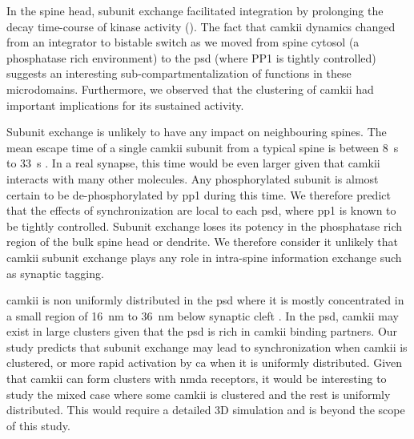 \documentclass[9pt,lineno,doublespacing]{elife}
\begin{document}
In the spine head, subunit exchange facilitated integration by prolonging the
decay time-course of kinase activity ().  The fact that
\gls{camkii} dynamics changed from an integrator to bistable switch as we moved
from spine cytosol (a phosphatase rich environment) to the \gls{psd} (where PP1
is tightly controlled) suggests an interesting sub-compartmentalization of
functions in these microdomains. Furthermore, we observed that the clustering of
\gls{camkii} had important implications for its sustained activity.

Subunit exchange is unlikely to have any impact on neighbouring spines. The mean
escape time of a single \gls{camkii} subunit from a typical spine is between
\SI{8}{\second} to \SI{33}{\second} \citep{holcman_diffusion_2011}. In a real
synapse, this time would be even larger given that \gls{camkii} interacts with
many other molecules. Any phosphorylated subunit is almost certain to be
de-phosphorylated by \gls{pp1} during this time. We therefore predict that the
effects of synchronization are local to each \gls{psd}, where \gls{pp1} is known
to be tightly controlled.  Subunit exchange loses its potency in the phosphatase
rich region of the bulk spine head or dendrite. We therefore consider it
unlikely that \gls{camkii} subunit exchange plays any role in intra-spine
information exchange such as synaptic tagging.

\Gls{camkii} is non uniformly distributed in the \gls{psd} where it is mostly
concentrated in a small region of \SI{16}{\nano \meter} to \SI{36}{\nano \meter}
below synaptic cleft \citep{petersen_distribution_2003}. In the \gls{psd},
\gls{camkii} may exist in large clusters given that the \gls{psd} is rich in
\gls{camkii} binding partners.  Our study predicts that subunit exchange may
lead to synchronization when \gls{camkii} is clustered, or more rapid activation
by \gls{ca} when it is uniformly distributed. Given that \gls{camkii} can form
clusters with \gls{nmda} receptors, it would be interesting to study the mixed
case where some \gls{camkii} is clustered and the rest is uniformly distributed.
This would require a detailed 3D simulation and is beyond the scope of this 
study.
\end{document}
